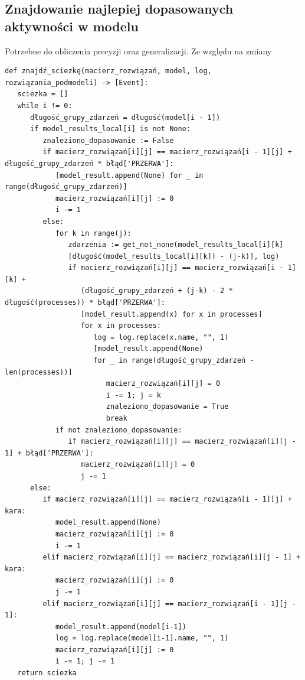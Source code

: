 \subsection{Znajdowanie najlepiej dopasowanych aktywności w modelu}
Potrzebne do obliczenia precyzji oraz generalizacji. Ze względu na zmiany
\lstset{caption=Znajdowanie ścieżki w modelu, captionpos=b}
\lstset{label=src:traceback, frame=single}
\begin{lstlisting}[escapeinside=``]
def znajdź_sciezkę(macierz_rozwiązań, model, log, rozwiązania_podmodeli) -> [Event]:
   sciezka = []
   while i != 0:
      długość_grupy_zdarzeń = długość(model[i - 1])
      if model_results_local[i] is not None:
         znaleziono_dopasowanie := False
         if macierz_rozwiązań[i][j] == macierz_rozwiązań[i - 1][j] + długość_grupy_zdarzeń * błąd['PRZERWA']:
            [model_result.append(None) for _ in range(długość_grupy_zdarzeń)]
            macierz_rozwiązań[i][j] := 0
            i -= 1
         else:
            for k in range(j):
               zdarzenia := get_not_none(model_results_local[i][k]
               [długość(model_results_local[i][k]) - (j-k)], log)
               if macierz_rozwiązań[i][j] == macierz_rozwiązań[i - 1][k] + 
                  (długość_grupy_zdarzeń + (j-k) - 2 * długość(processes)) * błąd['PRZERWA']:
                  [model_result.append(x) for x in processes]
                  for x in processes:
                     log = log.replace(x.name, "", 1)
                     [model_result.append(None) 
                     for _ in range(długość_grupy_zdarzeń - len(processes))]
                        macierz_rozwiązań[i][j] = 0
                        i -= 1; j = k
                        znaleziono_dopasowanie = True
                        break
            if not znaleziono_dopasowanie:
               if macierz_rozwiązań[i][j] == macierz_rozwiązań[i][j - 1] + błąd['PRZERWA']:
                  macierz_rozwiązań[i][j] = 0
                  j -= 1
      else:
         if macierz_rozwiązań[i][j] == macierz_rozwiązań[i - 1][j] + kara:
            model_result.append(None)
            macierz_rozwiązań[i][j] := 0
            i -= 1
         elif macierz_rozwiązań[i][j] == macierz_rozwiązań[i][j - 1] + kara:
            macierz_rozwiązań[i][j] := 0
            j -= 1
         elif macierz_rozwiązań[i][j] == macierz_rozwiązań[i - 1][j - 1]:
            model_result.append(model[i-1])
            log = log.replace(model[i-1].name, "", 1)
            macierz_rozwiązań[i][j] := 0
            i -= 1; j -= 1
   return sciezka
\end{lstlisting}

